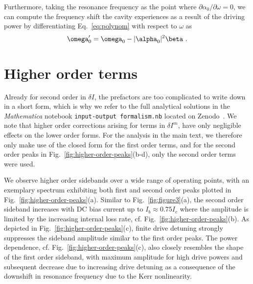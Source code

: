 Furthermore, taking the resonance frequency as the point where $\partial\alpha_0/\partial\omega=0$, we can compute the frequency shift the cavity experiences as a result of the driving power by differentiating Eq.~\eqref{eq:polynom} with respect to $\omega$ as
% 
\begin{align}
\omega_0^\prime = \omega_0 - \abs{\alpha_0}^2\beta\ .
\label{eq:Duffing-shift}
\end{align}


\section{Higher order terms}\label{app:higher-orders}
% 
Already for second order in $\delta I$, the prefactors are too complicated to write down in a short form, which is why we refer to the full analytical solutions in the \textit{Mathematica} notebook \texttt{input-output formalism.nb} located on Zenodo~\cite{schmidtDataProcessingCurrent2020}.
% 
We note that higher order corrections arising for terms in $\delta I^m$, have only negligible effects on the lower order forms.
% 
For the analysis in the main text, we therefore only make use of the closed form for the first order terms, and for the second order peaks in Fig.~\ref{fig:higher-order-peaks}(b-d), only the second order terms were used.

We observe higher order sidebands over a wide range of operating points, with an exemplary spectrum exhibiting both first and second order peaks plotted in Fig.~\ref{fig:higher-order-peaks}(a).
% 
Similar to Fig.~\ref{fig:figure3}(a), the second order sideband increases with DC bias current up to $I_b\approx 0.75 I_c$ where the amplitude is limited by the increasing internal loss rate, cf. Fig.~\ref{fig:higher-order-peaks}(b).
%
As depicted in Fig.~\ref{fig:higher-order-peaks}(c), finite drive detuning strongly suppresses the sideband amplitude similar to the first order peaks.
% 
The power dependence, cf. Fig.~\ref{fig:higher-order-peaks}(c), also closely resembles the shape of the first order sideband, with maximum amplitude for high drive powers and subsequent decrease due to increasing drive detuning as a consequence of the downshift in resonance frequency due to the Kerr nonlinearity.

